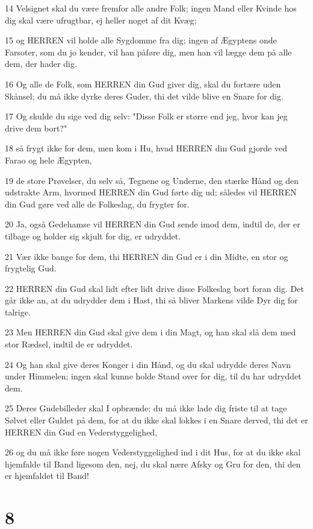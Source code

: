\par 14 Velsignet skal du være fremfor alle andre Folk; ingen Mand eller Kvinde hos dig skal være ufrugtbar, ej heller noget af dit Kvæg;
\par 15 og HERREN vil holde alle Sygdomme fra dig; ingen af Ægyptens onde Farsoter, som du jo kender, vil han påføre dig, men han vil lægge dem på alle dem, der hader dig.
\par 16 Og alle de Folk, som HERREN din Gud giver dig, skal du fortære uden Skånsel; du må ikke dyrke deres Guder, thi det vilde blive en Snare for dig.
\par 17 Og skulde du sige ved dig selv: "Disse Folk er større end jeg, hvor kan jeg drive dem bort?"
\par 18 så frygt ikke for dem, men kom i Hu, hvad HERREN din Gud gjorde ved Farao og hele Ægypten,
\par 19 de store Prøvelser, du selv så, Tegnene og Underne, den stærke Hånd og den udstrakte Arm, hvormed HERREN din Gud førte dig ud; således vil HERREN din Gud gøre ved alle de Folkeslag, du frygter for.
\par 20 Ja, også Gedehamse vil HERREN din Gud sende imod dem, indtil de, der er tilbage og holder sig skjult for dig, er udryddet.
\par 21 Vær ikke bange for dem, thi HERREN din Gud er i din Midte, en stor og frygtelig Gud.
\par 22 HERREN din Gud skal lidt efter lidt drive disse Folkeslag bort foran dig. Det går ikke an, at du udrydder dem i Hast, thi så bliver Markens vilde Dyr dig for talrige.
\par 23 Men HERREN din Gud skal give dem i din Magt, og han skal slå dem med stor Rædsel, indtil de er udryddet.
\par 24 Og han skal give deres Konger i din Hånd, og du skal udrydde deres Navn under Himmelen; ingen skal kunne holde Stand over for dig, til du har udryddet dem.
\par 25 Deres Gudebilleder skal I opbrænde; du må ikke lade dig friste til at tage Sølvet eller Guldet på dem, for at du ikke skal lokkes i en Snare derved, thi det er HERREN din Gud en Vederstyggelighed,
\par 26 og du må ikke føre nogen Vederstyggelighed ind i dit Hus, for at du ikke skal hjemfalde til Band ligesom den, nej, du skal nære Afsky og Gru for den, thi den er hjemfaldet til Band!

\chapter{8}

